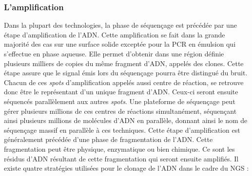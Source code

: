 \documentclass[12pt,twoside]{reedthesis}
\theoremstyle{definition}
\theoremstyle{definition}
\theoremstyle{remark}
\begin{document}
  \subsubsection{L'amplification}\label{lamplification}
  
  Dans la plupart des technologies, la phase de séquençage est précédée
  par une étape d'amplification de l'ADN. Cette amplification se fait dans
  la grande majorité des cas sur une surface solide exceptée pour la PCR
  en émulsion qui s'effectue en phase aqueuse. Elle permet d'obtenir dans
  une région définie plusieurs milliers de copies du même fragment d'ADN,
  appelés des clones. Cette étape assure que le signal émis lors du
  séquençage pourra être distingué du bruit. Chacun de ces \emph{spots}
  d'amplification appelés aussi centre de réaction, se retrouve donc être
  le représentant d'un unique fragment d'ADN. Ceux-ci seront ensuite
  séquencés parallèlement aux autres \emph{spots}. Une plateforme de
  séquençage peut gérer plusieurs millions de ces centres de réactions
  simultanément, séquençant ainsi plusieurs millions de molécules d'ADN en
  parallèle, donnant ainsi le nom de séquençage massif en parallèle à ces
  techniques. Cette étape d'amplification est généralement précédée d'une
  phase de fragmentation de l'ADN. Cette fragmentation peut être physique,
  enzymatique ou bien chimique. Ce sont les résidus d'ADN résultant de
  cette fragmentation qui seront ensuite amplifiés. Il existe quatre
  stratégies utilisées pour le clonage de l'ADN dans le cadre du NGS :
  
\end{document}
